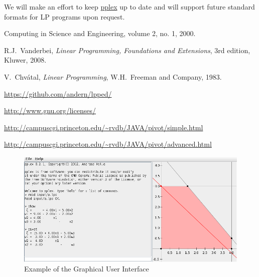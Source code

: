 \documentclass[ukenglish]{nik}
\begin{document}
We will make an effort to keep \url{pplex} up to date and will support 
future standard formats for LP programs upon request.


\begin{thebibliography}{99}
 Computing in Science and Engineering, volume 2, no. 1, 2000.

 R.J.~Vanderbei, 
\emph{Linear Programming, Foundations and Extensions},
3rd edition, Kluwer, 2008.

 V.~Chv\'atal,
\emph{Linear Programming},
W.H.~Freeman and Company, 1983.

\url{https://github.com/andern/lpped/}

\url{http://www.gnu.org/licenses/}

\url{http://campuscgi.princeton.edu/~rvdb/JAVA/pivot/simple.html}

\url{http://campuscgi.princeton.edu/~rvdb/JAVA/pivot/advanced.html}

\end{thebibliography}

\begin{figure}[htpb]
	\begin{center}
		\includegraphics[width=\textwidth]{ex_gui.jpg}
	\end{center}
	\caption{Example of the Graphical User Interface}
	\label{fig:ex_gui}
\end{figure}
\end{document}
